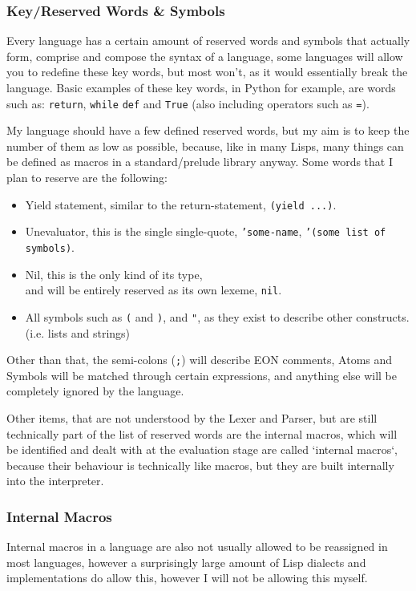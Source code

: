 \documentclass{article}
\newcommand{\code}[1]{\texttt{#1}}
\begin{document}
    \clearpage
    \subsubsection{Key/Reserved Words \& Symbols}
      Every language has a certain amount of reserved words and symbols that
      actually form, comprise and compose the syntax of a language, some
      languages will allow you to redefine these key words, but most won't, as
      it would essentially break the language.  Basic examples of these key
      words, in Python for example, are words such as: \code{return}, \code{while}
      \code{def} and \code{True} (also including operators such as \code{=}).

      My language should have a few defined reserved words, but my aim is to keep
      the number of them as low as possible, because, like in many Lisps, many
      things can be defined as macros in a standard/prelude library anyway.
      Some words that I plan to reserve are the following:

      \begin{itemize}
        \item Yield statement, similar to the return-statement, \code{(yield ...)}.
        \item Unevaluator, this is the single single-quote, \code{'some-name},
              \code{'(some list of symbols)}.
        \item Nil, this is the only kind of its type,\\
              and will be entirely reserved as its own lexeme, \code{nil}.
        \item All symbols such as \code{(} and \code{)}, and \code{"}, as they
              exist to describe other constructs. (i.e. lists and strings)
      \end{itemize}

      Other than that, the semi-colons (\code{;}) will describe EON comments,
      Atoms and Symbols will be matched through certain expressions, and
      anything else will be completely ignored by the language.

      Other items, that are not understood by the Lexer and Parser, but are
      still technically part of the list of reserved words are the internal
      macros, which will be identified and dealt with at the evaluation stage
      are called `internal macros`, because their behaviour is technically like
      macros, but they are built internally into the interpreter.

    \subsubsection{Internal Macros}
      Internal macros in a language are also not usually allowed to be reassigned
      in most languages, however a surprisingly large amount of Lisp dialects
      and implementations do allow this, however I will not be allowing this
      myself.
\end{document}
